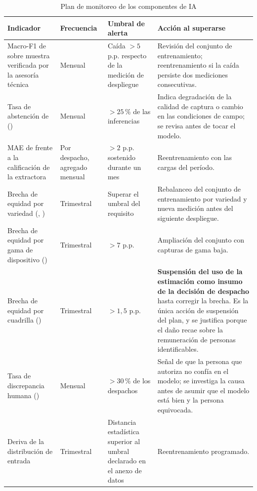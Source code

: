 \begin{table}[H]
\centering\footnotesize
\caption{Plan de monitoreo de los componentes de IA}
\label{tab:monitoreo-ia}
\begin{tabular}{|L{3.8cm}|C{2.0cm}|C{2.4cm}|L{5.8cm}|}
\hline
{}\textbf{Indicador} & \textbf{Frecuencia} & \textbf{Umbral de alerta} & \textbf{Acción al superarse}\\ \hline
Macro-F1 de  sobre muestra verificada por la asesoría técnica & Mensual & Caída $> 5$ p.p. respecto de la medición de despliegue & Revisión del conjunto de entrenamiento; reentrenamiento si la caída persiste dos mediciones consecutivas.\\ \hline
Tasa de abstención de  () & Mensual & $> 25\,\%$ de las inferencias & Indica degradación de la calidad de captura o cambio en las condiciones de campo; se revisa antes de tocar el modelo.\\ \hline
MAE de  frente a la calificación de la extractora & Por despacho, agregado mensual & $> 2$ p.p. sostenido durante un mes & Reentrenamiento con las cargas del período.\\ \hline
Brecha de equidad por variedad (, ) & Trimestral & Superar el umbral del requisito & Rebalanceo del conjunto de entrenamiento por variedad y nueva medición antes del siguiente despliegue.\\ \hline
Brecha de equidad por gama de dispositivo () & Trimestral & $> 7$ p.p. & Ampliación del conjunto con capturas de gama baja.\\ \hline
Brecha de equidad por cuadrilla () & Trimestral & $> 1{,}5$ p.p. & \textbf{Suspensión del uso de la estimación como insumo de la decisión de despacho} hasta corregir la brecha. Es la única acción de suspensión del plan, y se justifica porque el daño recae sobre la remuneración de personas identificables.\\ \hline
Tasa de discrepancia humana () & Mensual & $> 30\,\%$ de los despachos & Señal de que la persona que autoriza no confía en el modelo; se investiga la causa antes de asumir que el modelo está bien y la persona equivocada.\\ \hline
Deriva de la distribución de entrada & Trimestral & Distancia estadística superior al umbral declarado en el anexo de datos & Reentrenamiento programado.\\ \hline
\end{tabular}
\end{table}

